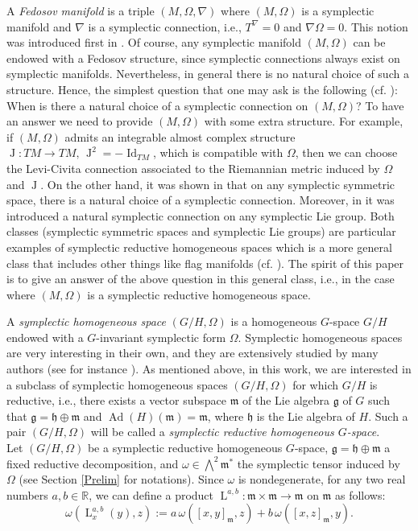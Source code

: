 \documentclass[preprint,12pt,1p]{elsarticle}
\theoremstyle{plain}
\theoremstyle{definition}
\newcommand{\rel}{\mathbb{R}}
\newcommand{\n}{\nabla}
\newcommand{\id}{\operatorname{Id}}
\newcommand{\Ad}{\operatorname{Ad}}
\newcommand{\J}{\operatorname{J}}
\numberwithin{equation}{section}
\newcommand{\lab}{\operatorname{L}^{a,b}}
\begin{document}
A \textit{Fedosov manifold} is a triple $(M,\Omega,\n)$ where $(M,\Omega)$ is a symplectic manifold and $\n$ is a symplectic connection, i.e., $T^\n=0$ and $\n\Omega=0$. This notion was introduced first in \cite{Gel}. Of course, any symplectic manifold $(M,\Omega)$ can be endowed with a Fedosov structure, since symplectic connections always exist on symplectic manifolds. Nevertheless, in general there is no natural choice of such a structure. Hence, the simplest question that one may ask is the following (cf. \cite{Cah}): When is there a natural choice of a symplectic connection on $(M,\Omega)$? To have an answer we need to provide $(M,\Omega)$ with some extra structure. For example, if $(M,\Omega)$ admits an integrable almost complex structure $\J:TM\to TM,\,\J^2=-\id_{TM}$, which is compatible with $\Omega$, then we can choose the Levi-Civita connection associated to the Riemannian metric induced by $\Omega$ and $\J$. On the other hand, it was shown in \cite{Bie} that on any symplectic symmetric space, there is a natural choice of a symplectic connection. Moreover, in \cite{BenBo6} it was introduced a natural symplectic connection on any symplectic Lie group. Both classes (symplectic symmetric spaces and symplectic Lie groups) are particular examples of symplectic reductive homogeneous spaces which is a more general class that includes other things like flag manifolds (cf. \cite{Alek,Arv}). The spirit of this paper is to give an answer of the above question in this general class, i.e., in the case where $(M,\Omega)$ is a symplectic reductive homogeneous space. 



A \textit{symplectic homogeneous space} $(G/H,\Omega)$ is a homogeneous $G$-space $G/H$ endowed with a $G$-invariant symplectic form $\Omega$. Symplectic homogeneous spaces are very interesting in their own, and they are extensively studied by many authors (see for instance \cite{Chu,Bo}). As mentioned above, in this work, we are interested in a subclass of symplectic homogeneous spaces $(G/H,\Omega)$ for which $G/H$ is reductive, i.e., there exists a vector subspace $\mathfrak{m}$ of the Lie algebra $\mathfrak{g}$ of $G$ such that $\mathfrak{g}=\mathfrak{h}\oplus\mathfrak{m}$ and $\Ad(H)(\mathfrak{m})=\mathfrak{m}$, where $\mathfrak{h}$ is the Lie algebra of $H$. Such a pair $(G/H,\Omega)$ will be called a \textit{symplectic reductive homogeneous $G$-space}.\\


Let $(G/H,\Omega)$ be a symplectic reductive homogeneous $G$-space, $\mathfrak{g}=\mathfrak{h}\oplus\mathfrak{m}$ a fixed reductive decomposition, and $\omega\in\bigwedge^2\mathfrak{m}^*$ the symplectic tensor induced by $\Omega$ (see Section \ref{Prelim} for notations). Since $\omega$ is nondegenerate, for any two real numbers $a,b\in\rel$, we can define a product $\lab:\mathfrak{m}\times\mathfrak{m}\to\mathfrak{m}$ on $\mathfrak{m}$ as follows:
\begin{equation}\label{na}
\omega\left(\lab_x(y),z\right):=a\,\omega\left([x,y]_\mathfrak{m},z\right)+b\,\omega\left([x,z]_\mathfrak{m},y\right).
\end{equation}
\end{document}
